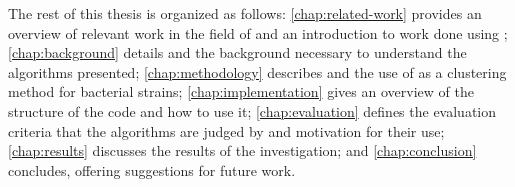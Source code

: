 The rest of this thesis is organized as follows:
\autoref{chap:related-work} provides an overview of relevant work in the field of \mst{} and an introduction to work done using \cplop{};
\autoref{chap:background} details \cplop{} and the background necessary to understand the algorithms presented;
\autoref{chap:methodology} describes \krap{} and the use of \dbscan{} as a clustering method for bacterial strains;
\autoref{chap:implementation} gives an overview of the structure of the code and how to use it;
\autoref{chap:evaluation} defines the evaluation criteria that the algorithms are judged by and motivation for their use;
\autoref{chap:results} discusses the results of the investigation;
and
\autoref{chap:conclusion} concludes, offering suggestions for future work.